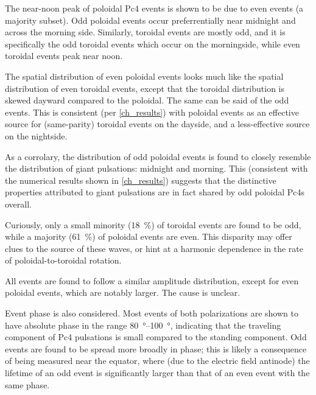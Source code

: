 The near-noon peak of poloidal Pc4 events is shown to be due to even events (a
majority subset). Odd poloidal events occur preferrentially near midnight and
across the morning side. Similarly, toroidal events are mostly odd, and it is
specifically the odd toroidal events which occur on the morningside, while even
toroidal events peak near noon. 

The spatial distribution of even poloidal events looks much like the spatial
distribution of even toroidal events, except that the toroidal distribution is
skewed dayward compared to the poloidal. The same can be said of the odd
events. This is consistent (per \cref{ch_results}) with poloidal events as an
effective source for (same-parity) toroidal events on the dayside, and a
less-effective source on the nightside. 

As a corrolary, the distribution of odd poloidal events is found to closely
resemble the distribution of giant pulsations: midnight and morning. This
(consistent with the numerical results shown in \cref{ch_results}) suggests
that the distinctive properties attributed to giant pulsations are in fact
shared by odd poloidal Pc4s overall. 

Curiously, only a small minority (\SI{18}{\percent}) of toroidal events are
found to be odd, while a majority (\SI{61}{\percent}) of poloidal events are
even. This disparity may offer clues to the source of these waves, or hint at
a harmonic dependence in the rate of poloidal-to-toroidal rotation. 

All events are found to follow a similar amplitude distribution, except for
even poloidal events, which are notably larger. The cause is unclear. 

Event phase is also considered. Most events of both polarizations are shown to
have absolute phase in the range \SIrange{80}{100}{\degree}, indicating that
the traveling component of Pc4 pulsations is small compared to the standing
component. Odd events are found to be spread more broadly in phase; this is
likely a consequence of being measured near the equator, where (due to the
electric field antinode) the lifetime of an odd event is significantly larger
than that of an even event with the same phase. 



